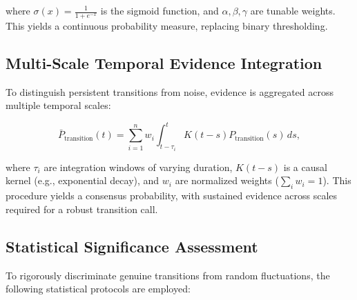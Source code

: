 where \(\sigma(x) = \frac{1}{1+e^{-x}}\) is the sigmoid function, and \(\alpha, \beta, \gamma\) are tunable weights. This yields a continuous probability measure, replacing binary thresholding.

\subsection{Multi-Scale Temporal Evidence Integration}

To distinguish persistent transitions from noise, evidence is aggregated across multiple temporal scales:

\begin{equation}
\bar{P}_{\text{transition}}(t) = \sum_{i=1}^{n} w_i \int_{t-\tau_i}^{t} K(t-s) P_{\text{transition}}(s) \, ds,
\end{equation}

where \(\tau_i\) are integration windows of varying duration, \(K(t-s)\) is a causal kernel (e.g., exponential decay), and \(w_i\) are normalized weights (\(\sum_i w_i = 1\)). This procedure yields a consensus probability, with sustained evidence across scales required for a robust transition call.

\subsection{Statistical Significance Assessment}

To rigorously discriminate genuine transitions from random fluctuations, the following statistical protocols are employed:

